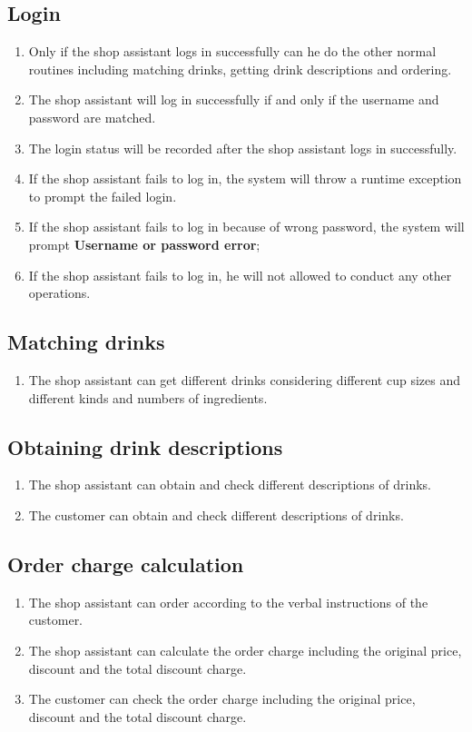 \documentclass[a4paper]{report}
\begin{document}
\subsection{Login}
\begin{enumerate}
\item Only if the shop assistant logs in successfully can he do the other normal routines including matching drinks, getting drink descriptions and ordering.
\item The shop assistant will log in successfully if and only if the username and password are matched.
\item The login status will be recorded after the shop assistant logs in successfully.
\item If the shop assistant fails to log in, the system will throw a runtime exception to prompt the failed login.
\item If the shop assistant fails to log in because of wrong password, the system will prompt \textbf{Username or password error};
\item If the shop assistant fails to log in, he will not allowed to conduct any other operations.
\end{enumerate}

\subsection{Matching drinks}

\begin{enumerate}
\item The shop assistant can get different drinks considering different cup sizes and different kinds and numbers of ingredients.
\end{enumerate}

\subsection{Obtaining drink descriptions}
\begin{enumerate}
\item The shop assistant can obtain and check different descriptions of drinks.
\item The customer can obtain and check different descriptions of drinks.
\end{enumerate}

\subsection{Order charge calculation}
\begin{enumerate}
\item The shop assistant can order according to the verbal instructions of the customer.
\item The shop assistant can calculate the order charge including the original price, discount and the total discount charge.
\item The customer can check the order charge including the original price, discount and the total discount charge.
\end{enumerate}
\end{document}
